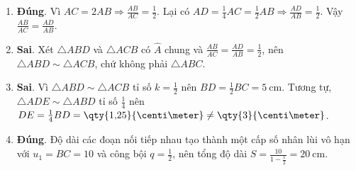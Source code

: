 \begin{baitap}
\begin{traloi}
		\begin{enumerate}
			\item \textbf{Đúng}. Vì $AC = 2AB \Rightarrow \frac{AB}{AC} = \frac{1}{2}$. Lại có $AD = \frac{1}{4}AC = \frac{1}{2}AB \Rightarrow \frac{AD}{AB} = \frac{1}{2}$. Vậy $\frac{AB}{AC} = \frac{AD}{AB}$.
			\item \textbf{Sai}. Xét $\triangle ABD$ và $\triangle ACB$ có $\widehat{A}$ chung và $\frac{AB}{AC} = \frac{AD}{AB} = \frac{1}{2}$, nên $\triangle ABD \sim \triangle ACB$, chứ không phải $ \triangle ABC. $
			\item \textbf{Sai}. Vì $\triangle ABD \sim \triangle ACB$ tỉ số $k = \frac{1}{2}$ nên $BD = \frac{1}{2}BC = \qty{5}{\centi\meter}$. Tương tự, $\triangle ADE \sim \triangle ABD$ tỉ số $\frac{1}{4}$ nên $DE = \frac{1}{4}BD = \qty{1{,}25}{\centi\meter} \neq \qty{3}{\centi\meter}$.
			\item \textbf{Đúng}. Độ dài các đoạn nối tiếp nhau tạo thành một cấp số nhân lùi vô hạn với $u_1 = BC = 10$ và công bội $q = \frac{1}{2}$, nên tổng độ dài $S = \frac{10}{1 - \frac{1}{2}} = \qty{20}{\centi\meter}$.
		\end{enumerate}
	\end{traloi}
\end{baitap}
